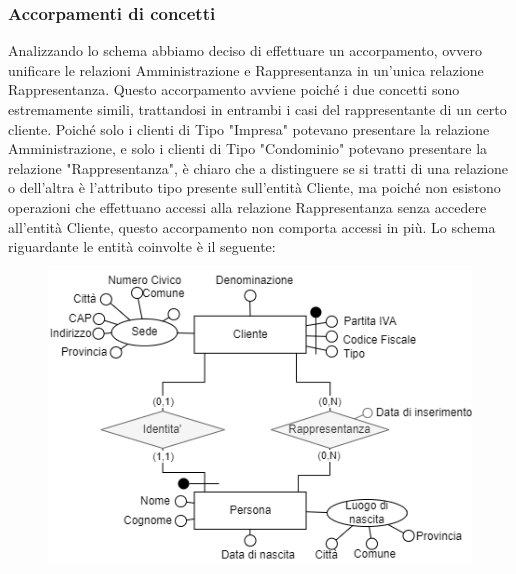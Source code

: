 \documentclass{elegantbook}
\begin{document}
	\subsubsection{Accorpamenti di concetti}
		Analizzando lo schema abbiamo deciso di effettuare un accorpamento, ovvero unificare le relazioni Amministrazione e Rappresentanza in un'unica relazione Rappresentanza. Questo accorpamento avviene poiché i due concetti sono estremamente simili, trattandosi in entrambi i casi del rappresentante di un certo cliente. Poiché solo i clienti di Tipo "Impresa" potevano presentare la relazione Amministrazione, e solo i clienti di Tipo "Condominio" potevano presentare la relazione "Rappresentanza", è chiaro che a distinguere se si tratti di una relazione o dell'altra è l'attributo tipo presente sull'entità Cliente, ma poiché non esistono operazioni che effettuano accessi alla relazione Rappresentanza senza accedere all'entità Cliente, questo accorpamento non comporta accessi in più.
		Lo schema riguardante le entità coinvolte è il seguente:
		\begin{figure}[H]
			\centering
			\includegraphics[scale=0.5]{../Img/DBSchemes/Rappresentanza.png}
		\end{figure}
		
\end{document}
